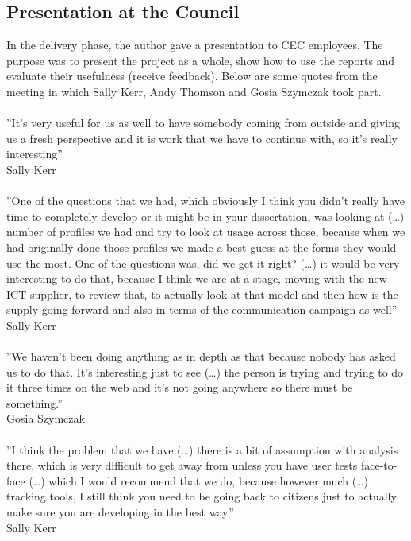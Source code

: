 		\subsection{Presentation at the Council}
		
In the delivery phase, the author gave a presentation to CEC employees. The purpose was to present the project as a whole, show how to use the reports and evaluate their usefulness (receive feedback). Below are some quotes from the meeting in which Sally Kerr, Andy Thomson and Gosia Szymczak took part.\\\\
''It’s very useful for us as well to have somebody coming from outside and giving us a fresh perspective and it is work that we have to continue with, so it’s really interesting''\\
Sally Kerr\\\\
''One of the questions that we had, which obviously I think you didn’t really have time to completely develop or it might be in your dissertation, was looking at (…) number of profiles we had and try to look at usage across those, because when we had originally done those profiles we made a best guess at the forms they would use the most. One of the questions was, did we get it right? (…) it would be very interesting to do that, because I think we are at a stage, moving with the new ICT supplier, to review that, to actually look at that model and then how is the supply going forward and also in terms of the communication campaign as well''\\
Sally Kerr\\\\
''We haven’t been doing anything as in depth as that because nobody has asked us to do that. It’s interesting just to see (…) the person is trying and trying to do it three times on the web and it’s not going anywhere so there must be something.''\\
Gosia Szymczak\\\\
''I think the problem that we have (…) there is a bit of assumption with analysis there, which is very difficult to get away from unless you have user tests face-to-face (…) which I would recommend that we do, because however much (…) tracking tools, I still think you need to be going back to citizens just to actually make sure you are developing in the best way.''\\
Sally Kerr\\\\
